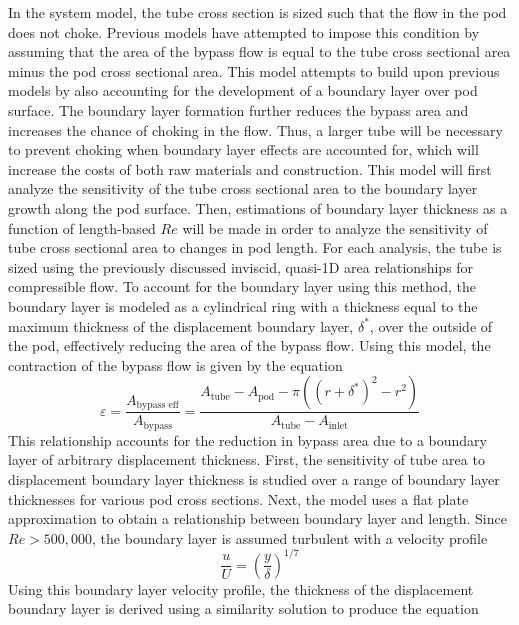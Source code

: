 In the system model, the tube cross section is sized such that the flow in the pod does not choke.
Previous models have attempted to impose this condition by assuming that the
area of the bypass flow is equal to the tube cross sectional area minus the
pod cross sectional area.\cite{Chin} This model attempts to build upon
previous models by also accounting for the development of a boundary layer over pod surface.
The boundary layer formation further reduces the bypass area and increases the
chance of choking in the flow. Thus, a larger tube will be necessary to prevent
choking when boundary layer effects are accounted for, which will increase the
costs of both raw materials and construction. This model will first analyze the
sensitivity of the tube cross sectional area to the boundary layer growth along
the pod surface. Then, estimations of boundary layer thickness as a function of
length-based $Re$ will be made in order to analyze the sensitivity of tube
cross sectional area to changes in pod length.
For each analysis, the tube is sized using the previously discussed inviscid,
quasi-1D area relationships for compressible flow. To account for the boundary
layer using this method, the boundary layer is modeled as a cylindrical ring
with a thickness equal to the maximum thickness of the displacement boundary layer,
$\delta^{*}$, over the outside of the pod, effectively reducing the area of the bypass flow.
Using this model, the contraction of the bypass flow is given by the equation
\begin{equation}
	\label{eq:epsilon}
	\varepsilon  = \frac{A_\text{bypass eff}}{A_\text{bypass}} = \frac{A_\text{tube}-A_\text{pod} -\pi  (  ( r+\delta ^{*}  )^{2}-r^{2}  )}{A_\text{tube}-A_\text{inlet}}
\end{equation}
This relationship accounts for the reduction in bypass area due to a boundary
layer of arbitrary displacement thickness. First, the sensitivity of tube area
to displacement boundary layer thickness is studied over a range of boundary
layer thicknesses for various pod cross sections. Next, the model uses a flat
plate approximation to obtain a relationship between boundary layer and length.
Since $Re > 500,000$, the boundary layer is assumed turbulent with a velocity profile \cite{FoxMcDonald}
\begin{equation}
	\label{eq:boundary_layer_profile}
	\frac{u}{U} = (\frac{y}{\delta })^{1/7}
\end{equation}
Using this boundary layer velocity profile, the thickness of the displacement
boundary layer is derived using a similarity solution to produce the equation \cite{FoxMcDonald}
